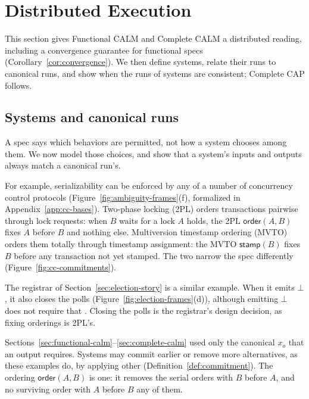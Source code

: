 \section{Distributed Execution}
\label{sec:distributed-execution}

This section gives Functional CALM and Complete CALM a distributed reading,
including a convergence guarantee for functional specs
(Corollary~\ref{cor:convergence}).  We then define systems, relate their runs to
canonical runs, and show when the runs of systems are consistent; Complete CAP follows.



\subsection{Systems and canonical runs}
\label{sec:systems}

A spec says which behaviors are permitted, not how a system chooses among them.
We now model those choices, and show that a system's inputs and outputs always
match a canonical run's.

For example, serializability can be enforced by any of a number of concurrency
control protocols (Figure~\ref{fig:ambiguity-frames}(f), formalized in
Appendix~\ref{app:cc-bases}).  Two-phase locking (2PL) orders transactions
pairwise through lock requests: when $B$ waits for a lock $A$ holds, the 2PL \commitment $\mathsf{order}(A,B)$ fixes $A$ before $B$ and nothing else.  Multiversion
timestamp ordering (MVTO)~\cite{bernstein1981concurrency} orders them totally
through timestamp assignment: the MVTO \commitment $\mathsf{stamp}(B)$ fixes $B$ before any
transaction not yet stamped.  The
two narrow the spec differently (Figure~\ref{fig:cc-commitments}).

The registrar of Section~\ref{sec:election-story} is a similar example.  When
it emits $\bot$, it also closes the polls (Figure~\ref{fig:election-frames}(d)),
although emitting $\bot$ does not require that \commitment.  Closing the polls is the registrar's
design decision, as fixing orderings is 2PL's.

Sections~\ref{sec:functional-calm}--\ref{sec:complete-calm} used only the
canonical \commitment $x_o$ that an output requires.  Systems may commit
earlier or remove more alternatives, as these examples do, by applying other
\commitments (Definition~\ref{def:commitment}).  The ordering \commitment
$\mathsf{order}(A,B)$ is one: it removes the serial orders with $B$ before $A$,
and no surviving order with $A$ before $B$ \outrel any of them.

